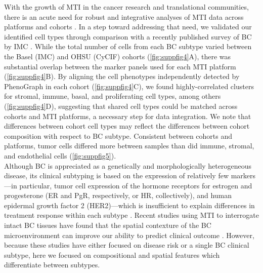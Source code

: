 \documentclass[preprint,review,3p,12pt]{elsarticle}
\begin{document}
With the growth of MTI in the cancer research and translational communities, there is an acute need for robust and integrative analyses of MTI data across platforms and cohorts \cite{htan2020}. In a step toward addressing that need, we validated our identified cell types through comparison with a recently published survey of BC by IMC \cite{jackson_single-cell_2020}. While the total number of cells from each BC subtype varied between the Basel (IMC) and OHSU (CyCIF) cohorts (\autoref{fig:suppfig4}A), there was substantial overlap between the marker panels used for each MTI platform (\autoref{fig:suppfig4}B). By aligning the cell phenotypes independently detected by PhenoGraph in each cohort (\autoref{fig:suppfig4}C), we found highly-correlated clusters for stromal, immune, basal, and proliferating cell types, among others (\autoref{fig:suppfig4}D), suggesting that shared cell types could be matched across cohorts and MTI platforms, a necessary step for data integration. We note that differences between cohort cell types may reflect the differences between cohort composition with respect to BC subtype. Consistent between cohorts and platforms, tumor cells differed more between samples than did immune, stromal, and endothelial cells (\autoref{fig:suppfig5}). \\

Although BC is appreciated as a genetically and morphologically heterogeneous disease, its clinical subtyping is based on the expression of relatively few markers—in particular, tumor cell expression of the hormone receptors for estrogen and progesterone (ER and PgR, respectively, or HR, collectively), and human epidermal growth factor 2 (HER2)—which is insufficient to explain differences in treatment response within each subtype \cite{bcreview2015}. Recent studies using MTI to interrogate intact BC tissues have found that the spatial contexture of the BC microenvironment can improve our ability to predict clinical outcome \cite{jackson_single-cell_2020,keren2018}. However, because these studies have either focused on disease risk or a single BC clinical subtype, here we focused on compositional and spatial features which differentiate between subtypes. \\
\end{document}
